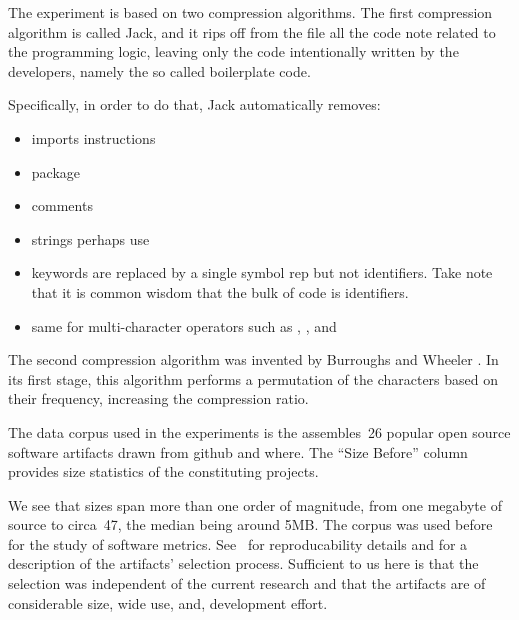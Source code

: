
The experiment is based on two compression algorithms.
The first compression algorithm is called Jack, and it rips off from the file all the code note related to the programming logic, leaving
only the code intentionally written by the developers, namely the so called boilerplate code.

Specifically, in order to do that, Jack automatically removes:

\begin{itemize}
  \item imports instructions
  \item package
  \item comments
  \item strings perhaps use
  \item keywords are replaced by a single symbol rep
        but not identifiers. Take note that it is common wisdom that the bulk of code is identifiers.
  \item same for multi-character operators such as \cc{->}, \cc{[]}, and \cc{<<<<=}
\end{itemize}

The second compression algorithm was invented by Burroughs and Wheeler
\cite{Burrows:Wheeler:94}.  In its first stage, this algorithm performs a
permutation of the characters based on their frequency, increasing the
compression ratio.

The data corpus used in the experiments is the assembles~26 popular \Java open
source software artifacts drawn from github and where\copyFromGal. The ``Size Before'' 
column  provides size statistics of the constituting projects.


\begin{table}
  \label{table:corpus}
  \caption{The results of the compression using the Burroughs-Wheeler algorithm}
  \centering
\end{table}

We see that sizes span more than one order of magnitude, from one megabyte of
source to circa~47, the median being around 5MB. The corpus was used before for 
the study of software metrics. See~\cite{Matteo:Cite:Gal:TwoPapers} for
reproducability details and for a description of the artifacts' selection
process.  Sufficient to us here is that the selection was independent of the
current research and that the artifacts are of considerable size, wide
use, and, development effort.
